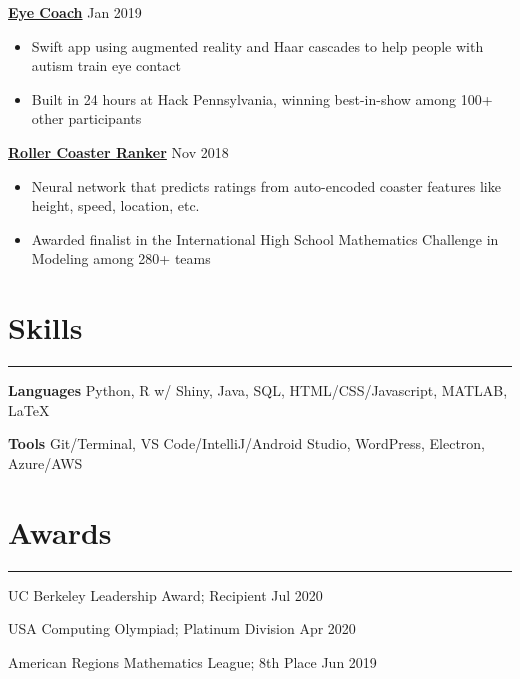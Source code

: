 \documentclass[11pt]{article}
\newcommand{\resumesection}[1]{\vspace{-0.3cm}\section*{\color{highlight}#1}\vspace{-0.3cm}\hrule\vspace{0.3cm}}
\begin{document}
\textbf{\href{https://github.com/gautomdas/eye-coach}{Eye Coach}} \hfill Jan 2019 \par

\begin{itemize}
	\item Swift app using augmented reality and Haar cascades to help people with autism train eye contact
	\item Built in 24 hours at Hack Pennsylvania, winning best-in-show among 100+ other participants
\end{itemize}\vspace{0.1cm} \par

\textbf{\href{https://github.com/prayaggordy/HiMCM}{Roller Coaster Ranker}}  \hfill Nov 2018\par

\begin{itemize}
	\item Neural network that predicts ratings from auto-encoded coaster features like height, speed, location, etc.
	\item Awarded finalist in the International High School Mathematics Challenge in Modeling among 280+ teams
\end{itemize}\par

\resumesection{Skills}

\textbf{Languages} Python, R w/ Shiny, Java, SQL, HTML/CSS/Javascript, MATLAB, \LaTeX \par
\textbf{Tools} Git/Terminal, VS Code/IntelliJ/Android Studio, WordPress, Electron, Azure/AWS

\resumesection{Awards}

UC Berkeley Leadership Award; Recipient \hfill Jul 2020 \par
USA Computing Olympiad; Platinum Division \hfill Apr 2020 \par
American Regions Mathematics League; 8th Place \hfill Jun 2019 \par
\end{document}
